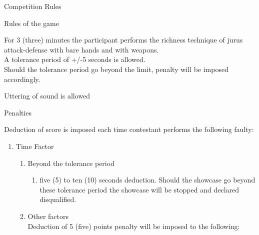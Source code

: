 \begin{legal}
\begin{legal}
    \end{legal}


\item Competition Rules
    \begin{legal}
    \item Rules of the game
        \begin{legal}
        \item For 3 (three) minutes the participant performs the richness technique of jurus attack-defense with bare hands and with weapons.\\
        A tolerance period of +/-5 seconds is allowed.\\
        Should the tolerance period go beyond the limit, penalty will be imposed accordingly.
        \item Uttering of sound is allowed
        \end{legal}

    \item Penalties
        \begin{legal}
        \item\label{pt:ganda_deductions} Deduction of score is imposed each time contestant performs the following faulty:
            \begin{enumerate}[label=\alph*.]
            \item\label{pt:ganda_time_factor} Time Factor
                \begin{enumerate}[label*=\arabic*.]
                \item Beyond the tolerance period
                    \begin{enumerate}[label*=\arabic*.]
                    \item five (5) to ten (10) seconds deduction. Should the showcase go beyond these tolerance 
                    period the showcase will be stopped and declared disqualified.
                    \end{enumerate}
                \item Other factors \\
                    Deduction of 5 (five) points penalty will be imposed to the following:


\end{enumerate}
\end{enumerate}
\end{legal}
\end{legal}
\end{legal}
